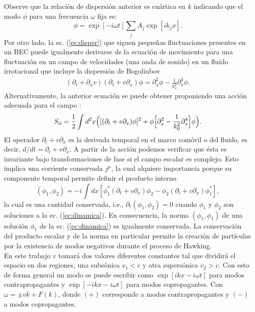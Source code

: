 Observe que la relaci\'{o}n de dispersi\'{o}n anterior es cu\'{a}rtica en $k$  indicando que el modo $\phi$ para una frecuencia $\omega$ fija es:
\begin{equation}
\phi=\exp[-i\omega t]\sum_j A_j \exp[i k_j x].
\end{equation}
Por otro lado, la ec. (\ref{ec:disper}) que siguen peque\~{n}as fluctuaciones presentes en un BEC puede igualmente derivarse de la ecuaci\'{o}n de movimiento para una fluctuaci\'{o}n en un campo de velocidades (una onda de sonido) en un fluido irrotacional que incluye la dispersi\'{o}n de Bogoliubov
\begin{align}\label{ec:dinamica}
(\partial_t+\partial_x v)(\partial_t+v\partial_x)\phi=\partial_x^2\phi-\frac{1}{k_0^2}\partial_x^4\phi.
\end{align}
Alternativamente, la anterior ecuaci\'{o}n se puede obtener proponiendo una acci\'{o}n adecuada para el campo \citep{Corley1999}:
\begin{equation}
S_{\phi}=\frac{1}{2}\int d^2x\Bigl([(\partial_t+v\partial_x)\phi]^2+\phi\Bigl[\partial_x^2-\frac{1}{k_0^2}\partial_x^4\Bigr]\phi\Bigr).
\end{equation}
El operador $\partial_t+v\partial_x$ es la derivada temporal en el marco com\'{o}vil o del fluido, es decir, $d/dt=\partial_t+v\partial_x$. A partir de la acci\'{o}n podemos verificar que \'{e}sta es invariante bajo transformaciones de fase si el campo escalar es complejo. Esto implica una corriente conservada $j^{\mu}$, la cual alquiere importancia porque su componente temporal permite definir el producto interno 
\begin{equation}\label{ec:norma1}
(\phi_1,\phi_2)=-i\int dx[\phi_1^*(\partial_t+v\partial_x)\phi_2-\phi_2(\partial_t+v\partial_x)\phi_1^{*}],
\end{equation}
la cual es una cantidad conservada, i.e., $\partial_t(\phi_1,\phi_2)=0$ cuando $\phi_1$ y $\phi_2$ son soluciones a la ec. (\ref{ec:dinamica}). En consecuencia, la norma $(\phi_1,\phi_1)$ de una soluci\'{o}n $\phi_1$ de la ec. (\ref{ec:dinamica}) es igualmente conservada. La conservación del producto escalar y de la norma en particular permite la creaci\'{o}n de part\'{i}culas por la existencia de modos negativos durante el proceso de Hawking.\\

En este trabajo $v$ tomar\'{a} dos valores diferentes constantes tal que dividir\'{a} el espacio en dos regiones, una subs\'{o}nica $v_1<c$ y otra supers\'{o}nica $v_2>c$. Con esto de forma general un modo se puede escribir como $\exp[ikx-i\omega t]$ para modos contrapropagantes y $\exp[-ikx-i\omega t]$ para modos copropagantes. Con $\omega=\pm vk+F(k)$, donde $(+)$ corresponde a modos contrapropagantes y $(-)$ a modos copropagantes.\\

